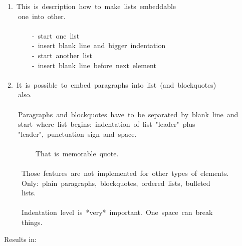\documentclass[12pt]{article}
\begin{document}
\begin{ttfamily}\begin{flushleft}
\mbox{~1.~This~is~description~how~to~make~lists~embeddable}\\
\mbox{~~~~one~into~other.}\\
\mbox{}\\
\mbox{~~~~~~~~-~start~one~list}\\
\mbox{~~~~~~~~-~insert~blank~line~and~bigger~indentation}\\
\mbox{~~~~~~~~-~start~another~list}\\
\mbox{~~~~~~~~-~insert~blank~line~before~next~element}\\
\mbox{}\\
\mbox{~2.~It~is~possible~to~embed~paragraphs~into~list~(and~blockquotes)}\\
\mbox{~~~~also.}\\
\mbox{}\\
\mbox{~~~~Paragraphs~and~blockquotes~have~to~be~separated~by~blank~line~and}\\
\mbox{~~~~start~where~list~begins:~indentation~of~list~"leader"~plus}\\
\mbox{~~~~"leader",~punctuation~sign~and~space.}\\
\mbox{}\\
\mbox{~~~~~~~~~That~is~memorable~quote.}\\
\mbox{}\\
\mbox{~~~~~Those~features~are~not~implemented~for~other~types~of~elements.}\\
\mbox{~~~~~Only:~plain~paragraphs,~blockquotes,~ordered~lists,~bulleted}\\
\mbox{~~~~~lists.}\\
\mbox{}\\
\mbox{~~~~~Indentation~level~is~*very*~important.~One~space~can~break}\\
\mbox{~~~~~things.}\\
\end{flushleft}\end{ttfamily}

Results in:
\end{document}
